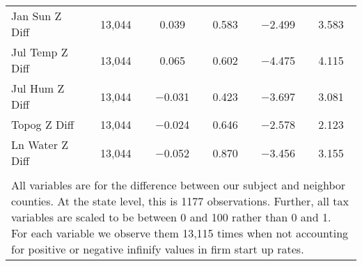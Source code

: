 \begin{table}[!htbp]
\begin{tabular}{@{\extracolsep{5pt}}lccccc}
Jan Sun Z Diff & 13,044 & 0.039 & 0.583 & $-$2.499 & 3.583 \\ 
Jul Temp Z Diff & 13,044 & 0.065 & 0.602 & $-$4.475 & 4.115 \\ 
Jul Hum Z Diff & 13,044 & $-$0.031 & 0.423 & $-$3.697 & 3.081 \\ 
Topog Z Diff & 13,044 & $-$0.024 & 0.646 & $-$2.578 & 2.123 \\ 
Ln Water Z Diff & 13,044 & $-$0.052 & 0.870 & $-$3.456 & 3.155 \\ 
\hline \\[-1.8ex] 
\multicolumn{6}{l}{All variables are for the difference between our subject and neighbor counties. At the state level, this is 1177 observations. Further, all tax variables are scaled to be between 0 and 100 rather than 0 and 1. For each variable we observe them 13,115 times when not accounting for positive or negative infinify values in firm start up rates.} \\ 
\end{tabular} 
\end{table} 
